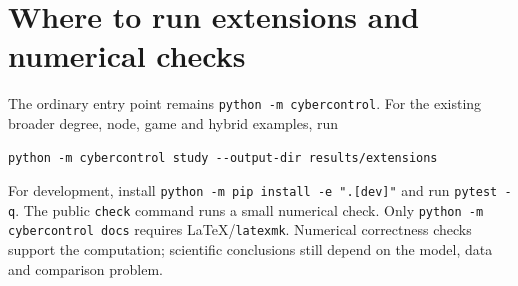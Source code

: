 \documentclass[11pt,a4paper]{article}
\theoremstyle{definition}
\theoremstyle{remark}
\begin{document}
\section{Where to run extensions and numerical checks}
The ordinary entry point remains \texttt{python -m cybercontrol}. For the existing broader degree, node, game and hybrid examples, run
\begin{lstlisting}[language={}]
python -m cybercontrol study --output-dir results/extensions
\end{lstlisting}
For development, install \texttt{python -m pip install -e ".[dev]"} and run \texttt{pytest -q}. The public \texttt{check} command runs a small numerical check. Only \texttt{python -m cybercontrol docs} requires LaTeX/\texttt{latexmk}. Numerical correctness checks support the computation; scientific conclusions still depend on the model, data and comparison problem.
\end{document}
